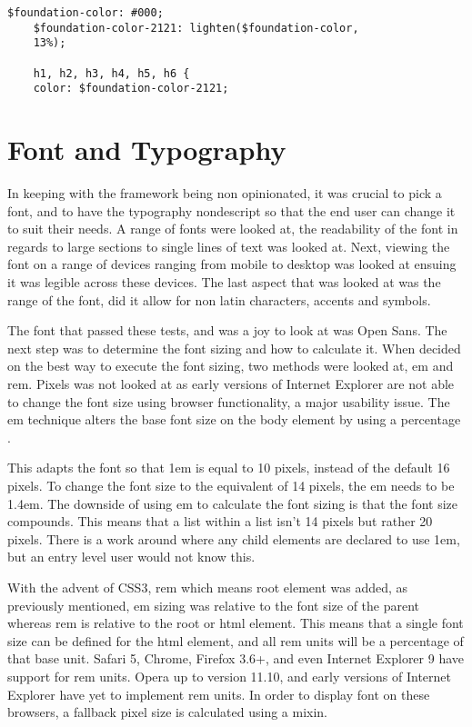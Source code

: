 \begin{lstlisting}[language=CSS3]
	$foundation-color: #000;
	$foundation-color-2121: lighten($foundation-color, 
	13%);

	h1, h2, h3, h4, h5, h6 {
  	color: $foundation-color-2121;
\end{lstlisting}

\section*{Font and Typography}
In keeping with the framework being non opinionated, it was crucial to pick a font, and to have the typography nondescript so that the end user can change it to suit their needs. A range of fonts were looked at, the readability of the font in regards to large sections to single lines of text was looked at. Next, viewing the font on a range of devices ranging from mobile to desktop was looked at ensuing it was legible across these devices. The last aspect that was looked at was the range of the font, did it allow for non latin characters, accents and symbols\cite{WORD16}.

The font that passed these tests, and was a joy to look at was Open Sans. The next step was to determine the font sizing and how to calculate it. When decided on the best way to execute the font sizing, two methods were looked at, em and rem. Pixels was not looked at as early versions of Internet Explorer are not able to change the font size using browser functionality, a major usability issue. The em technique alters the base font size on the body element by using a percentage \cite{GUN16}.

This adapts the font so that 1em is equal to 10 pixels, instead of the default 16 pixels. To change the font size to the equivalent of 14 pixels, the em needs to be 1.4em. The downside of using em to calculate the font sizing is that the font size compounds. This means that a list within a list isn't 14 pixels but rather 20 pixels. There is a work around where any child elements are declared to use 1em, but an entry level user would not know this. 

With the advent of CSS3, rem which means root element was added, as previously mentioned, em sizing was relative to the font size of the parent whereas rem is relative to the root or html element. This means that a single font size can be defined for the html element, and all rem units will be a percentage of that base unit. Safari 5, Chrome, Firefox 3.6+, and even Internet Explorer 9 have support for rem units. Opera up to version 11.10, and early versions of Internet Explorer have yet to implement rem units. In order to display font on these browsers, a fallback pixel size is calculated using a mixin. 

